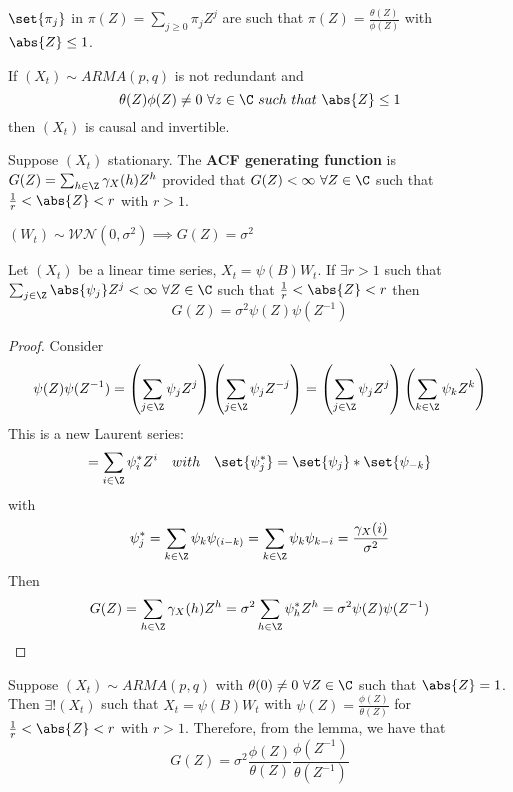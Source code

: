 \begin{corollary}
    $\set{\pi_j}$ in $\pi(Z)=\sum_{j\ge0}\pi_jZ^j$ are such that $\pi(Z)=\frac{\theta(Z)}{\phi(Z)}$ with $\abs{Z}\le1$.
\end{corollary}

\begin{corollary}
    If $(X_t)\sim ARMA(p,q)$ is not redundant and
    \[
        \theta(Z)\phi(Z)\ne0\ \forall z\in\C\ such\ that\ \abs{Z}\le1  
    \] 
    then $(X_t)$ is causal and invertible.
\end{corollary}

\begin{definition}
    Suppose $(X_t)$ stationary. The \textbf{ACF generating function} is $G(Z)=\sum_{h\in\Z}\gamma_X(h)Z^h$ provided that $G(Z)<\infty\ \forall Z\in\C$ such that $\frac{1}{r}<\abs{Z}<r$ with $r>1$. 
\end{definition}

\begin{example}
    $(W_t)\sim\mathcal{WN}(0,\sigma^2)\implies G(Z)=\sigma^2$
\end{example}

\begin{lemma}
    Let $(X_t)$ be a linear time series, $X_t=\psi(B)W_t$. If $\exists r>1$ such that $\sum_{j\in\Z}\abs{\psi_j}Z^j<\infty\ \forall Z\in\C$ such that $\frac{1}{r}<\abs{Z}<r$ then
    \[
        G(Z)=\sigma^2\psi(Z)\psi(Z^{-1})
    \]
\end{lemma}

\begin{proof}
    Consider
    \[
        \psi(Z)\psi(Z^{-1})=\left(\sum_{j\in\Z}\psi_jZ^j\right)\left(\sum_{j\in\Z}\psi_jZ^{-j}\right)=\left(\sum_{j\in\Z}\psi_jZ^j\right)\left(\sum_{k\in\Z}\psi_kZ^k\right)  
    \]
    This is a new Laurent series:
    \[
        =\sum_{i\in\Z}\psi_i^*Z^i\ \ \ with\ \ \ \set{\psi_j^*}=\set{\psi_j}*\set{\psi_{-k}}  
    \]
    with
    \[
        \psi_j^*=\sum_{k\in\Z}\psi_k\psi_{(i-k)}=\sum_{k\in\Z}\psi_k\psi_{k-i}=\frac{\gamma_X(i)}{\sigma^2} 
    \]
    Then
    \[
        G(Z)=\sum_{h\in\Z}\gamma_X(h)Z^h=\sigma^2\sum_{h\in\Z}\psi_h^*Z^h=\sigma^2\psi(Z)\psi(Z^{-1})  
    \]
\end{proof}

\begin{example}
    Suppose $(X_t)\sim ARMA(p,q)$ with $\theta(0)\ne0\ \forall Z\in\C$ such that $\abs{Z}=1$. Then $\exists!(X_t)$ such that $X_t=\psi(B)W_t$ with $\psi(Z)=\frac{\phi(Z)}{\theta(Z)}$ for $\frac{1}{r}<\abs{Z}<r$ with $r>1$. Therefore, from the lemma, we have that
    \[
        G(Z)=\sigma^2\frac{\phi(Z)}{\theta(Z)}\frac{\phi(Z^{-1})}{\theta(Z^{-1})}  
    \]
\end{example}

